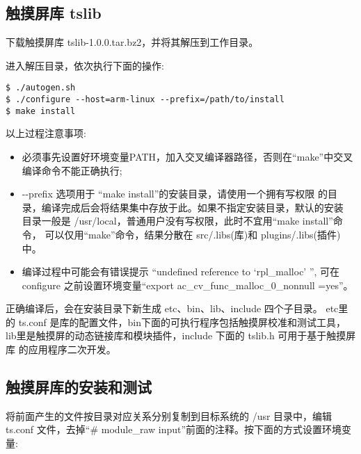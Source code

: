 \subsection{触摸屏库 tslib}
	下载触摸屏库 tslib-1.0.0.tar.bz2，并将其解压到工作目录。

	进入解压目录，依次执行下面的操作:

\begin{boxedminipage}{.9\textwidth}
\begin{verbatim}
$ ./autogen.sh
$ ./configure --host=arm-linux --prefix=/path/to/install
$ make install
\end{verbatim}
\end{boxedminipage}

以上过程注意事项:
\begin{itemize}
  \item 必须事先设置好环境变量PATH，加入交叉编译器路径，否则在``make''中交叉
	编译命令不能正确执行;
  \item -{}-prefix 选项用于 ``make install''的安装目录，请使用一个拥有写权限
	的目录，编译完成后会将结果集中存放于此。如果不指定安装目录，默认的安装
	目录一般是 /usr/local，普通用户没有写权限，此时不宜用``make install''命令，
	可以仅用``make''命令，结果分散在 src/.libs(库)和 plugins/.libs(插件)中。
  \item 编译过程中可能会有错误提示 ``undefined reference to `rpl\_malloc' '',
	可在 configure 之前设置环境变量``export ac\_cv\_func\_malloc\_0\_nonnull
	=yes''。
\end{itemize}

	正确编译后，会在安装目录下新生成 etc、bin、lib、include 四个子目录。
etc里的 ts.conf 是库的配置文件，bin下面的可执行程序包括触摸屏校准和测试工具，
lib里是触摸屏的动态链接库和模块插件，include 下面的 tslib.h 可用于基于触摸屏库
的应用程序二次开发。

\subsection{触摸屏库的安装和测试}
	将前面产生的文件按目录对应关系分别复制到目标系统的 /usr 目录中，编辑 ts.conf
文件，去掉``\# module\_raw input''前面的注释。按下面的方式设置环境变量:

